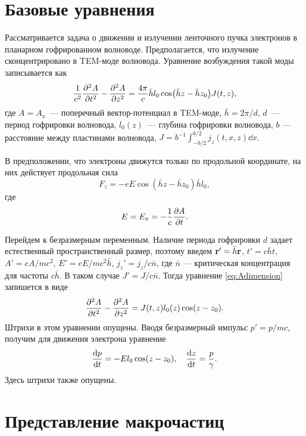 \documentclass[DIV=11,12pt,a4paper]{scrartcl}
\begin{document}
\tableofcontents

\section{Базовые уравнения}

Рассматривается задача о движении и излучении ленточного пучка электронов в планарном гофрированном волноводе.
Предполагается, что излучение сконцентрировано в TEM-моде волновода.
Уравнение возбуждения такой моды записывается как
\begin{equation}
    \frac{1}{c^2}\pdv[2]{A}{t} - \pdv[2]{A}{z} = \frac{4\pi}{c} \bar{h} l_0 \cos(\bar{h} z - \bar{h} z_0) J(t,z),
    \label{eq:Adimension}
\end{equation}
где $A=A_x$~--- поперечный вектор-потенциал в TEM-моде, $\bar{h} = 2\pi/d$, $d$~--- период гофрировки волновода, $l_0(z)$~--- глубина гофрировки волновода, $b$ --- расстояние между пластинами волновода, $J = b^{-1}\int_{-b/2}^{b/2} j_z(t,x,z) \dd{x}$.

В предположении, что электроны движутся только по продольной координате, на них действует продольная сила
\begin{equation}
    F_z = -e E \cos(\bar{h}z - \bar{h}z_0) \bar{h} l_0,
\end{equation}
где 
\begin{equation}
    E = E_x = -\frac{1}{c}\pdv{A}{t}.
\end{equation}

Перейдем к безразмерным переменным.
Наличие периода гофрировки $d$ задает естественный пространственный размер, поэтому введем $\vb{r}' = \bar{h} \vb{r}$, $t' = c\bar{h} t$, $A' = eA/mc^2$, $E' = eE/mc^2\bar{h}$, $j_z' = j_z / c \bar{n}$, где $\bar{n}$ --- критическая концентрация для частоты $c\bar{h}$.
В таком случае $J' = J/c \bar{n}$.
Тогда уравнение \eqref{eq:Adimension} запишется в виде
\begin{equation}
    \pdv[2]{A}{t} - \pdv[2]{A}{z} = J(t, z) l_0(z) \cos (z-z_0).
\end{equation}
Штрихи в этом уравнении опущены.
Вводя безразмерный импульс $p' = p/mc$, получим для движения электрона уравнение
\begin{equation}
    \dv{p}{t} = - E l_0 \cos (z-z_0), \quad \dv{z}{t} = \frac{p}{\gamma}.
\end{equation}
Здесь штрихи также опущены.

\section{Представление макрочастиц}
\end{document}
